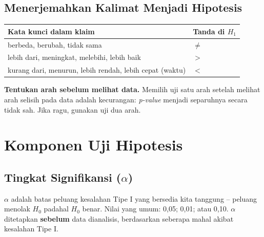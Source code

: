 \documentclass[
  indonesian,
  letterpaper,
]{book}
\newcounter{none} %
\begin{document}
\section{Menerjemahkan Kalimat Menjadi
Hipotesis}\label{menerjemahkan-kalimat-menjadi-hipotesis}

{\def\LTcaptype{none} %
\begin{longtable}[]{@{}ll@{}}
\toprule\noalign{}
Kata kunci dalam klaim & Tanda di \(H_1\) \\
\midrule\noalign{}
\endhead
\bottomrule\noalign{}
\endlastfoot
berbeda, berubah, tidak sama & \(\ne\) \\
lebih dari, meningkat, melebihi, lebih baik & \(>\) \\
kurang dari, menurun, lebih rendah, lebih cepat (waktu) & \(<\) \\
\end{longtable}
}

\begin{tcolorbox}[enhanced jigsaw, arc=.35mm, bottomrule=.15mm, bottomtitle=1mm, breakable, colback=white, colbacktitle=quarto-callout-warning-color!10!white, colframe=quarto-callout-warning-color-frame, coltitle=black, left=2mm, leftrule=.75mm, opacityback=0, opacitybacktitle=0.6, rightrule=.15mm, title=\textcolor{quarto-callout-warning-color}{\faExclamationTriangle}\hspace{0.5em}{Peringatan}, titlerule=0mm, toprule=.15mm, toptitle=1mm]

\textbf{Tentukan arah sebelum melihat data.} Memilih uji satu arah
setelah melihat arah selisih pada data adalah kecurangan: \emph{p-value}
menjadi separuhnya secara tidak sah. Jika ragu, gunakan uji dua arah.

\end{tcolorbox}


\chapter{Komponen Uji Hipotesis}\label{komponen-uji-hipotesis}

\section{\texorpdfstring{Tingkat Signifikansi
(\(\alpha\))}{Tingkat Signifikansi (\textbackslash alpha)}}\label{tingkat-signifikansi-alpha}

\(\alpha\) adalah batas peluang kesalahan Tipe I yang bersedia kita
tanggung -- peluang menolak \(H_0\) padahal \(H_0\) benar. Nilai yang
umum: 0,05; 0,01; atau 0,10. \(\alpha\) ditetapkan \textbf{sebelum} data
dianalisis, berdasarkan seberapa mahal akibat kesalahan Tipe I.
\end{document}
